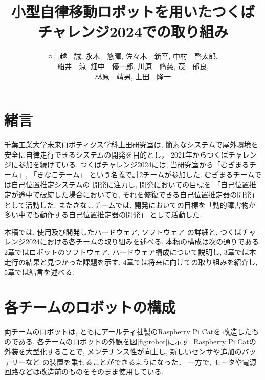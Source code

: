 \documentclass[twocolumn,9pt]{jsproceedings}
\title{小型自律移動ロボットを用いたつくばチャレンジ2024での取り組み}
\author{○吉越　誠\authorrefmark{2}, 永木　悠暉\authorrefmark{1}, 佐々木　新平\authorrefmark{1}, 中村　啓太郎\authorrefmark{1}, 
\\船井　涼\authorrefmark{2}, 畑中　優一郎\authorrefmark{2}, 川原　脩慈\authorrefmark{1}, 茂　郁良\authorrefmark{1}, 
\\林原　靖男\authorrefmark{1}, 上田　隆一\authorrefmark{1}}
\affiliation{千葉工業大学 未来ロボティクス学科 上田研究室 むぎまるチーム/きなこチーム}
\begin{document}
\maketitle


\section{緒言}
千葉工業大学未来ロボティクス学科上田研究室は, 
簡素なシステムで屋外環境を安全に自律走行できるシステムの開発を目的とし，
2021年からつくばチャレンジに参加を続けている. 
つくばチャレンジ2024には, 
当研究室から「むぎまるチーム」, 「きなこチーム」
という名義で計2チームが参加した. 
むぎまるチームでは自己位置推定システムの
開発に注力し, 開発においての目標を
「自己位置推定が途中で破綻した場合においても, 
それを修復できる自己位置推定器の開発」として活動した. 
またきなこチームでは, 
開発においての目標を「動的障害物が多い中でも動作する自己位置推定器の開発」
として活動した. 

本稿では, 使用及び開発したハードウェア, ソフトウェア
の詳細と, つくばチャレンジ2024における各チームの取り組みを述べる. 
本稿の構成は次の通りである. 
2章ではロボットのソフトウェア, ハードウェア構成について説明し, 
3章では本走行の結果と見つかった課題を示す. 
4章では将来に向けての取り組みを紹介し, 
5章では結言を述べる. 


\section{各チームのロボットの構成}
両チームのロボットは, 
ともにアールティ社製のRaspberry Pi Cat\cite{RTshop}を
改造したものである. 
各チームのロボットの外観を図\ref{fig:robot}に示す. 
Raspberry Pi Catの外装を大型化することで, 
メンテナンス性が向上し, 
新しいセンサや追加のバッテリーなど
の装置を乗せることができるようになった． 
一方で, モータや電源回路などは改造前のものをそのまま使用している. 
\end{document}
